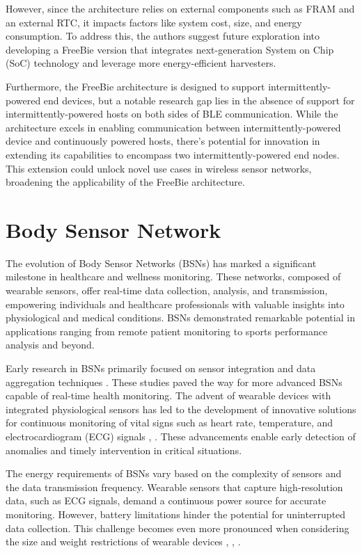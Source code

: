 \noindent However, since the architecture relies on external components such as FRAM and an external RTC, it impacts factors like system cost, size, and energy consumption. To address this, the authors suggest future exploration into developing a FreeBie version that integrates next-generation System on Chip (SoC) technology and leverage more energy-efficient harvesters.
\vspace{1\baselineskip}

\noindent Furthermore, the FreeBie architecture is designed to support intermittently-powered end devices, but a notable research gap lies in the absence of support for intermittently-powered hosts on both sides of BLE communication. While the architecture excels in enabling communication between intermittently-powered device and continuously powered hosts, there's potential for innovation in extending its capabilities to encompass two intermittently-powered end nodes. This extension could unlock novel use cases in wireless sensor networks, broadening the applicability of the FreeBie architecture.

\section{Body Sensor Network}
The evolution of Body Sensor Networks (BSNs) has marked a significant milestone in healthcare and wellness monitoring. These networks, composed of wearable sensors, offer real-time data collection, analysis, and transmission, empowering individuals and healthcare professionals with valuable insights into physiological and medical conditions. BSNs demonstrated remarkable potential in applications ranging from remote patient monitoring to sports performance analysis and beyond.
\vspace{1\baselineskip}

\noindent Early research in BSNs primarily focused on sensor integration and data aggregation techniques \cite{5678072}. These studies paved the way for more advanced BSNs capable of real-time health monitoring. The advent of wearable devices with integrated physiological sensors has led to the development of innovative solutions for continuous monitoring of vital signs such as heart rate, temperature, and electrocardiogram (ECG) signals \cite{BSNreview}, \cite{6555588}. These advancements enable early detection of anomalies and timely intervention in critical situations.
\vspace{1\baselineskip}

\noindent The energy requirements of BSNs vary based on the complexity of sensors and the data transmission frequency. Wearable sensors that capture high-resolution data, such as ECG signals, demand a continuous power source for accurate monitoring. However, battery limitations hinder the potential for uninterrupted data collection. This challenge becomes even more pronounced when considering the size and weight restrictions of wearable devices \cite{WANG2020112410}, \cite{4755157}, \cite{6755575}.
\vspace{1\baselineskip}

